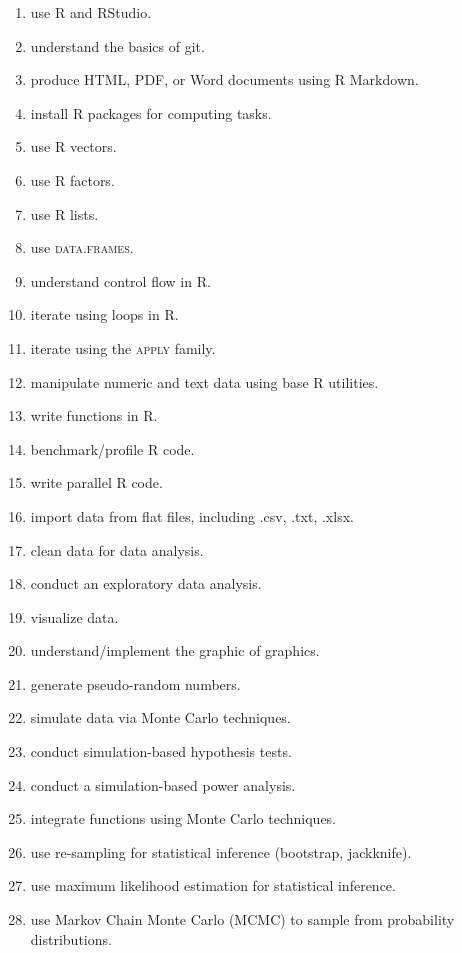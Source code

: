 \documentclass[11pt,onecolumn]{article}
\begin{document}
\begin{enumerate}
  \itemsep0em 
\item use R and RStudio.
\item understand the basics of git.
\item produce HTML, PDF, or Word documents using R Markdown.
\item install R packages for computing tasks.
\item use R vectors.
\item use R factors.
\item use R lists.
\item use \textsc{data.frames}.
\item understand control flow in R.
\item iterate using loops in R.
\item iterate using the \textsc{apply} family.
\item manipulate numeric and text data using base R utilities.
\item write functions in R.
\item benchmark/profile R code.
\item write parallel R code.
\item import data from flat files, including .csv, .txt, .xlsx.
\item clean data for data analysis.
\item conduct an exploratory data analysis.
\item visualize data.
\item understand/implement the graphic of graphics.
\item generate pseudo-random numbers.
\item simulate data via Monte Carlo techniques.
\item conduct simulation-based hypothesis tests.
\item conduct a simulation-based power analysis.
\item integrate functions using Monte Carlo techniques.
\item use re-sampling for statistical inference (bootstrap, jackknife).
\item use maximum likelihood estimation for statistical inference.
\item use Markov Chain Monte Carlo (MCMC) to sample from probability distributions.
\end{enumerate}
\end{document}

